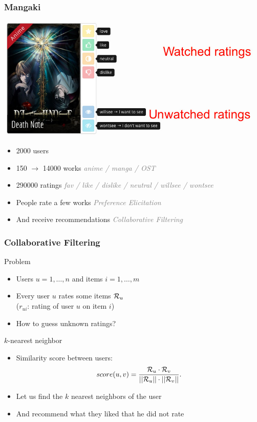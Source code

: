 \documentclass[handout]{beamer}
\begin{document}
\newcommand\discrete[1]{\textcolor{gray}{\hfill {\em \small #1}}}

\begin{frame}
	\frametitle{Mangaki}
    \includegraphics[width=\textwidth]{figures/ratings.jpg}
	\begin{itemize}
	\item 2000 users
	\item 150 $\rightarrow$ 14000 works \discrete{anime / manga / OST}
	\item 290000 ratings \discrete{fav / like / dislike / neutral / willsee / wontsee}
	\item People rate a few works \discrete{Preference Elicitation}
  \item And receive recommendations \discrete{Collaborative Filtering}
	\end{itemize}
\end{frame}

\begin{frame}
	\frametitle{Collaborative Filtering}
	\begin{block}{Problem}
		\begin{itemize}[<+->]
		\item Users $u = 1, \ldots, n$ and items $i = 1, \ldots, m$
		\item Every user $u$ rates some items $\mathcal{R}_u$\\(\alert{$r_{ui}$}: rating of user $u$ on item $i$)
        \item How to guess unknown ratings?
		\end{itemize}
	\end{block}
	\pause
	\begin{exampleblock}{$k$-nearest neighbor}
        \begin{itemize}
        \item Similarity score between users:
        \[ score(u, v) = \frac{\mathcal{R}_u \cdot \mathcal{R}_v}{||\mathcal{R}_u|| \cdot ||\mathcal{R}_v||}. \]
        \item Let us find the $k$ nearest neighbors of the user
        \item And recommend what they liked that he did not rate
        \end{itemize}
	\end{exampleblock}
\end{frame}
\end{document}
